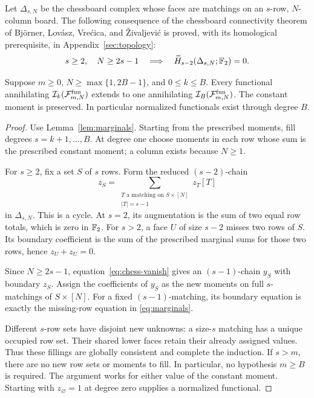 Let \(\Delta_{s,N}\) be the chessboard complex whose faces are matchings on
an \(s\)-row, \(N\)-column board. The following consequence of the
chessboard connectivity theorem of Bj\"orner, Lov\'asz, Vre\'cica,
and \v{Z}ivaljevi\'c \cite{BLVZ94} is proved, with its homological
prerequisite, in Appendix~\ref{sec:topology}:
\begin{equation}\label{eq:chess-vanish}
 s\ge2,\quad N\ge2s-1
 \quad\Longrightarrow\quad
 \widetilde H_{s-2}(\Delta_{s,N};\mathbb F_2)=0.
\end{equation}

\begin{theorem}\label{thm:moments}
Suppose \(m\ge0\), \(N\ge\max\{1,2B-1\}\), and \(0\le k\le B\).
Every functional annihilating
\(\mathcal I_k(\mathcal F^{\mathrm{fun}}_{m,N})\) extends to one annihilating
\(\mathcal I_B(\mathcal F^{\mathrm{fun}}_{m,N})\).
The constant moment is preserved. In particular normalized functionals
exist through degree \(B\).
\end{theorem}
\begin{proof}
Use Lemma~\ref{lem:marginals}. Starting from the prescribed moments, fill
degrees \(s=k+1,\ldots,B\).
At degree one choose moments in each row whose sum is the prescribed
constant moment; a column exists because \(N\ge1\).

For \(s\ge2\), fix a set \(S\) of \(s\) rows. Form the reduced
\((s-2)\)-chain
\[
 z_S=\sum_{\substack{T\text{ a matching on }S\times[N]\\|T|=s-1}}
             z_T[T]
\]
in \(\Delta_{s,N}\).
This is a cycle. At \(s=2\), its augmentation is the sum of two equal
row totals, which is zero in \(\mathbb F_2\).
For \(s>2\), a face \(U\) of size \(s-2\) misses two rows of \(S\).
Its boundary coefficient is the sum of the prescribed marginal sums for
those two rows, hence \(z_U+z_U=0\).

Since \(N\ge2s-1\), equation~\eqref{eq:chess-vanish} gives an
\((s-1)\)-chain \(y_S\) with boundary \(z_S\).
Assign the coefficients of \(y_S\) as the new moments on full
\(s\)-matchings of \(S\times[N]\).
For a fixed \((s-1)\)-matching, its boundary equation is exactly the
missing-row equation in \eqref{eq:marginals}.

Different \(s\)-row sets have disjoint new unknowns: a size-\(s\) matching
has a unique occupied row set. Their shared lower faces retain their
already assigned values. Thus these fillings are globally consistent and
complete the induction. If \(s>m\), there are no new row sets or
moments to fill. In particular, no hypothesis \(m\ge B\) is required.
The argument works for either value of the constant moment.
Starting with \(z_\varnothing=1\) at degree zero supplies a normalized
functional.
\end{proof}

